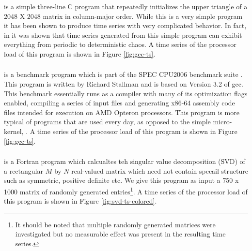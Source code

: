 \subsubsection{\col}
\col is a simple three-line C program that repeatedly initializes the upper triangle of a  2048 X 2048 matrix in column-major order. While this is a very simple program it has been shown to produce time series with very complicated behavior. In fact, in \cite{mytkowicz09} it was shown that time series generated from this simple program can exhibit everything from periodic to deterministic chaos.  A time series of the processor load of this program is shown in Figure \ref{fig:gcc-ts}.
\subsubsection{\gcc}

\gcc is a benchmark program which is part of the SPEC CPU2006 benchmark suite \cite{spec}. This program is written by Richard Stallman and is based on Version 3.2 of gcc. This benchmark essentially runs as a compiler with many of its optimization flags enabled, compiling a series of input files and generating x86-64 assembly code files intended for execution on AMD Opteron processors. This program is more typical of programs that are used every day, as opposed to the simple micro-kernel, \col. A time series of the processor load of this program is shown in Figure \ref{fig:gcc-ts}.



\subsubsection{\svd}

\svd is a Fortran program which calcualtes teh singular value decomposition (SVD) of a rectangular $M$ by $N$  real-valued matrix which need not contain specail structure such as symmetric, positive definite etc. We give this program as input a 750 x 1000 matrix of randomly generated entries\footnote{It should be noted that multiple randomly generated matrices were investigated but no measurable effect was present in the resulting time series.}. A time series of the processor load of this program is shown in Figure \ref{fig:svd-ts-colored}.

